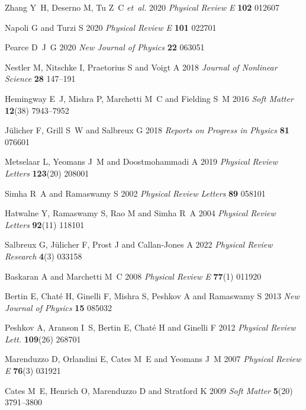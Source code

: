 \documentclass[12pt]{iopart}
\begin{document}
\begin{thebibliography}{100}
				Zhang Y~H, Deserno M, Tu Z~C {\em et~al.\/} 2020 {\em Physical Review E\/} {\bf
				  102} 012607
				
				Napoli G and Turzi S 2020 {\em Physical Review E\/} {\bf 101} 022701
				
				Pearce D~J~G 2020 {\em New Journal of Physics\/} {\bf 22} 063051
				
				Nestler M, Nitschke I, Praetorius S and Voigt A 2018 {\em Journal of Nonlinear
				  Science\/} {\bf 28} 147--191
				
				Hemingway E~J, Mishra P, Marchetti M~C and Fielding S~M 2016 {\em Soft
				  Matter\/} {\bf 12}(38) 7943--7952
				
				J{\"u}licher F, Grill S~W and Salbreux G 2018 {\em Reports on Progress in
				  Physics\/} {\bf 81} 076601
				
				Metselaar L, Yeomans J~M and Doostmohammadi A 2019 {\em Physical Review Letters\/}
				  {\bf 123}(20) 208001
				
				Simha R~A and Ramaswamy S 2002 {\em Physical Review Letters\/} {\bf 89} 058101
				
				Hatwalne Y, Ramaswamy S, Rao M and Simha R~A 2004 {\em Physical Review Letters\/} {\bf
				  92}(11) 118101
				
				Salbreux G, J\"ulicher F, Prost J and Callan-Jones A 2022 {\em Physical Review
				  Research\/} {\bf 4}(3) 033158
				
				Baskaran A and Marchetti M~C 2008 {\em Physical Review E\/} {\bf 77}(1) 011920
				
				Bertin E, Chat{\'{e}} H, Ginelli F, Mishra S, Peshkov A and Ramaswamy S 2013
				  {\em New Journal of Physics\/} {\bf 15} 085032
				
				Peshkov A, Aranson I~S, Bertin E, Chat\'e H and Ginelli F 2012 {\em Physical Review
				  Lett.\/} {\bf 109}(26) 268701
				
				Marenduzzo D, Orlandini E, Cates M~E and Yeomans J~M 2007 {\em Physical Review E\/}
				  {\bf 76}(3) 031921
				
				Cates M~E, Henrich O, Marenduzzo D and Stratford K 2009 {\em Soft Matter\/}
				  {\bf 5}(20) 3791--3800
				

\end{thebibliography}
\end{document}
